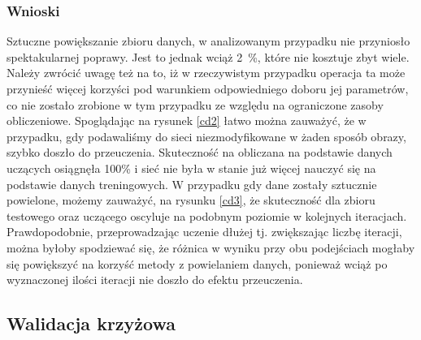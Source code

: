 \subsubsection{Wnioski}
Sztuczne powiększanie zbioru danych, w analizowanym przypadku nie przyniosło spektakularnej poprawy. Jest to jednak wciąż 2~\%, które nie kosztuje zbyt wiele. Należy zwrócić uwagę też na to, iż w rzeczywistym przypadku operacja ta może przynieść więcej korzyści pod warunkiem odpowiedniego doboru jej parametrów, co nie zostało zrobione w tym przypadku ze względu na ograniczone zasoby obliczeniowe. Spoglądając na rysunek \ref{cd2} łatwo można zauważyć, że w przypadku, gdy podawaliśmy do sieci niezmodyfikowane w żaden sposób obrazy, szybko doszło do przeuczenia. Skuteczność na obliczana na podstawie danych uczących osiągnęła 100\% i sieć nie była w stanie już więcej nauczyć się na podstawie danych treningowych. W przypadku gdy dane zostały sztucznie powielone, możemy zauważyć, na rysunku \ref{cd3}, że skuteczność dla zbioru testowego oraz uczącego oscyluje na podobnym poziomie w kolejnych iteracjach. Prawdopodobnie, przeprowadzając uczenie dłużej tj. zwiększając liczbę iteracji, można byłoby spodziewać się, że różnica w wyniku przy obu podejściach mogłaby się powiększyć na korzyść metody z powielaniem danych, ponieważ wciąż po wyznaczonej ilości iteracji nie doszło do efektu przeuczenia.

\subsection{Walidacja krzyżowa}\label{cvChapter}
